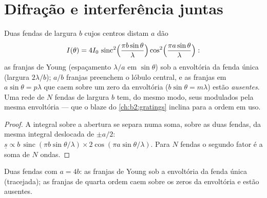 \section{Difração e interferência juntas}

\begin{proposition}\label{prop:b2:diffraction:combined}
Duas fendas de largura $b$ cujos centros distam $a$ dão
\[
I(\theta) = 4I_0\,\operatorname{sinc}^2\Bigl(\frac{\pi b\sin\theta}\lambda\Bigr)\cos^2\Bigl(\frac{\pi a\sin\theta}\lambda\Bigr) :
\]
as franjas de Young (espaçamento $\lambda/a$ em $\sin\theta$) sob a envoltória
da fenda única (largura $2\lambda/b$); $a/b$ franjas preenchem o lóbulo central, e as
franjas em $a\sin\theta = p\lambda$ que caem sobre um zero da envoltória
($b\sin\theta = m\lambda$) estão \emph{ausentes}. Uma rede de $N$ fendas de largura
$b$ tem, do mesmo modo, seus  modulados pela mesma envoltória ---
que o blaze do \cref{ch:b2:gratings} inclina para a ordem em uso.
\end{proposition}

\begin{proof}
A integral sobre a abertura se separa numa soma, sobre as duas fendas, da mesma
integral deslocada de $\pm a/2$: $\underline s \propto b\,\operatorname{sinc}(\pi b\sin\theta/\lambda)
\times2\cos(\pi a\sin\theta/\lambda)$. Para $N$ fendas o segundo fator é a
soma de $N$ ondas.
\end{proof}

\begin{omfigure}

{\small Duas fendas com $a = 4b$: as franjas de Young sob a envoltória
da fenda única (tracejada); as franjas de quarta ordem caem sobre os zeros
da envoltória e estão ausentes.}
\end{omfigure}

